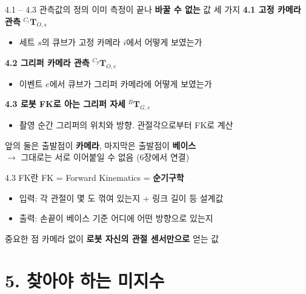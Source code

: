 \documentclass[aspectratio=169,11pt]{beamer}
\newcommand{\T}[3][]{{}^{#2}\mathbf{T}^{#1}_{#3}}   %
\begin{document}
\begin{frame}{4.1 -- 4.3 관측값의 정의}
  이미 측정이 끝나 \textbf{바꿀 수 없는} 값 세 가지
  \vfill
  \textbf{4.1 고정 카메라 관측} \hfill $\T{C_i}{O,s}$
  \vspace{-1mm}
  \begin{itemize}
    \item 세트 $s$의 큐브가 고정 카메라 $i$에서 어떻게 보였는가
  \end{itemize}
  \vfill
  \textbf{4.2 그리퍼 카메라 관측} \hfill $\T{C_g}{O,e}$
  \vspace{-1mm}
  \begin{itemize}
    \item 이벤트 $e$에서 큐브가 그리퍼 카메라에 어떻게 보였는가
  \end{itemize}
  \vfill
  \textbf{4.3 로봇 FK로 아는 그리퍼 자세} \hfill $\T{B}{G,e}$
  \vspace{-1mm}
  \begin{itemize}
    \item 촬영 순간 그리퍼의 위치와 방향. 관절각으로부터 FK로 계산
  \end{itemize}
  \vfill
  \begin{block}{}
    \centering
    앞의 둘은 출발점이 \textbf{카메라}, 마지막은 출발점이 \textbf{베이스}\\
    $\rightarrow$ 그대로는 서로 이어붙일 수 없음 (6장에서 연결)
  \end{block}
\end{frame}

\begin{frame}{4.3 FK란}
  FK = Forward Kinematics = \textbf{순기구학}
  \vfill
  \begin{itemize}
    \item 입력: 각 관절이 몇 도 꺾여 있는지 + 링크 길이 등 설계값
    \item 출력: 손끝이 베이스 기준 어디에 어떤 방향으로 있는지
  \end{itemize}
  \vfill
  \begin{block}{중요한 점}
    카메라 없이 \textbf{로봇 자신의 관절 센서만으로} 얻는 값
  \end{block}
\end{frame}

\section{5. 찾아야 하는 미지수}
\end{document}
